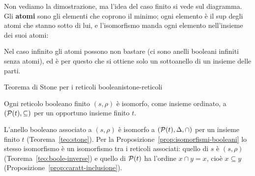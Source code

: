 \begin{spiegazione}
    Non vediamo la dimostrazione, ma l'idea del caso finito si vede sul diagramma. Gli \textbf{atomi} sono gli elementi che coprono il minimo;
    ogni elemento è il sup degli atomi che stanno sotto di lui, e l'isomorfismo manda ogni elemento nell'insieme dei suoi atomi:
    \begin{center}
    \end{center}
    Nel caso infinito gli atomi possono non bastare (ci sono anelli booleani infiniti senza atomi), ed è per questo che si ottiene solo un
    sottoanello di un insieme delle parti.
\end{spiegazione}

\begin{concetto}
\begin{Corollario}{Teorema di Stone per i reticoli booleani}{stone-reticoli}
    \begin{prerequisiti}
    \end{prerequisiti}
    Ogni reticolo booleano finito $(s, \rho)$ è isomorfo, come insieme ordinato, a $(\mathcal{P}(t), \subseteq)$ per un opportuno insieme finito $t$.
\end{Corollario}
\begin{dimostrazione}
    L'anello booleano associato a $(s, \rho)$ è isomorfo a $(\mathcal{P}(t), \Delta, \cap)$ per un insieme finito $t$ (Teorema~\ref{teo:stone}). Per la Proposizione~\ref{prop:isomorfismi-booleani}
    lo stesso isomorfismo è un isomorfismo tra i reticoli associati: quello di $s$ è $(s, \rho)$ (Teorema~\ref{teo:boole-inverse}) e quello di $\mathcal{P}(t)$ ha l'ordine
    $x \cap y = x$, cioè $x \subseteq y$ (Proposizione~\ref{prop:caratt-inclusione}).
\end{dimostrazione}
\end{concetto}

